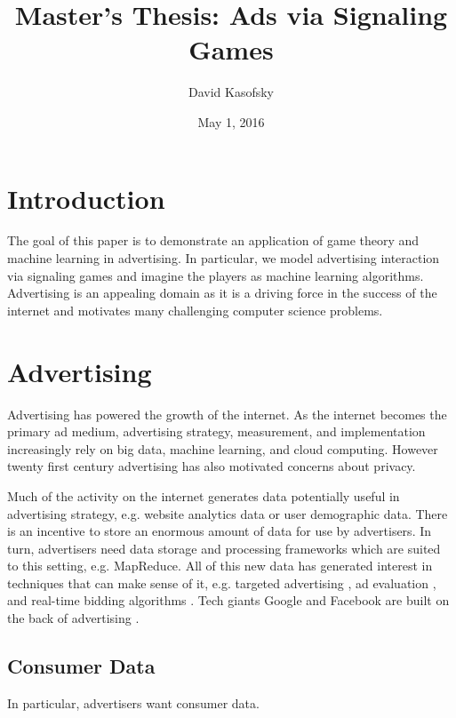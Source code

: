 \documentclass{article}
\title{Master's Thesis: Ads via Signaling Games}
\author{David Kasofsky}
\date{May 1, 2016}
\begin{document}
\maketitle

\newpage

\tableofcontents

\newpage

\section{Introduction}

The goal of this paper is to demonstrate an application of game theory and machine learning in advertising. In particular, we model advertising interaction via signaling games and imagine the players as machine learning algorithms. Advertising is an appealing domain as it is a driving force in the success of the internet and motivates many challenging computer science problems.

\section{Advertising}
Advertising has powered the growth of the internet. As the internet becomes the primary ad medium\cite{iab1}, advertising strategy, measurement, and implementation increasingly rely on big data, machine learning, and cloud computing. However twenty first century advertising has also motivated concerns about privacy.

Much of the activity on the internet generates data potentially useful in advertising strategy, e.g. website analytics data or user demographic data. There is an incentive to store an enormous amount of data for use by advertisers. In turn, advertisers need data storage and processing frameworks which are suited to this setting, e.g. MapReduce\cite{mapreduce1}. All of this new data has generated interest in techniques that can make sense of it, e.g. targeted advertising \cite{displayadsml1}, ad evaluation \cite{abhishek2012media}, and real-time bidding algorithms \cite{yuan2014survey}. Tech giants Google and Facebook are built on the back of advertising \cite{googlerevenue}.



\subsection{Consumer Data}
In particular, advertisers want consumer data. 
\end{document}
